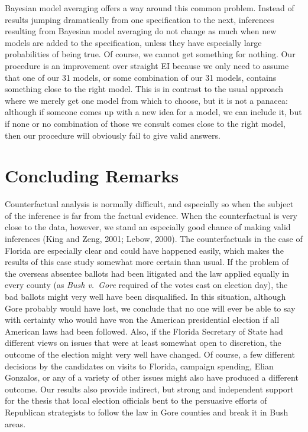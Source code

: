 \documentclass[11pt,titlepage]{article}
\begin{document}
Bayesian model averaging offers a way around this common problem.
Instead of results jumping dramatically from one specification to the
next, inferences resulting from Bayesian model averaging do not change
as much when new models are added to the specification, unless they
have especially large probabilities of being true.  Of course, we
cannot get something for nothing.  Our procedure is an improvement
over straight EI because we only need to assume that one of our 31
models, or some combination of our 31 models, contains something close
to the right model.  This is in contrast to the usual approach where
we merely get one model from which to choose, but it is not a panacea:
although if someone comes up with a new idea for a model, we can
include it, but if none or no combination of those we consult comes
close to the right model, then our procedure will obviously fail to
give valid answers.


\section{Concluding Remarks}\label{s:concl}

Counterfactual analysis is normally difficult, and especially so when
the subject of the inference is far from the factual evidence.  When
the counterfactual is very close to the data, however, we stand an
especially good chance of making valid inferences (King and Zeng,
2001; Lebow, 2000)\nocite{KinZen01,Lebow00}.  The counterfactuals in
the case of Florida are especially clear and could have happened
easily, which makes the results of this case study somewhat more
certain than usual.  If the problem of the overseas absentee ballots
had been litigated and the law applied equally in every county (as
\emph{Bush v.\ Gore} required of the votes cast on election day), the
bad ballots might very well have been disqualified.  In this
situation, although Gore probably would have lost, we conclude that no
one will ever be able to say with certainty who would have won the
American presidential election if all American laws had been followed.
Also, if the Florida Secretary of State had different views on issues
that were at least somewhat open to discretion, the outcome of the
election might very well have changed.  Of course, a few different
decisions by the candidates on visits to Florida, campaign spending,
Elian Gonzalos, or any of a variety of other issues might also have
produced a different outcome.  Our results also provide indirect, but
strong and independent support for the thesis that local election
officials bent to the persuasive efforts of Republican strategists to
follow the law in Gore counties and break it in Bush areas.
\end{document}
